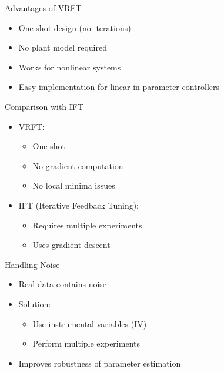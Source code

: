 \documentclass[hyperref={pdfpagemode=FullScreen},aspectratio=169]{beamer}
\begin{document}

\begin{frame}{Advantages of VRFT}
\begin{itemize}
\item One-shot design (no iterations)
\item No plant model required
\item Works for nonlinear systems
\item Easy implementation for linear-in-parameter controllers
\end{itemize}
\end{frame}


\begin{frame}{Comparison with IFT}
\begin{itemize}
\item VRFT:
\begin{itemize}
\item One-shot
\item No gradient computation
\item No local minima issues
\end{itemize}
\item IFT (Iterative Feedback Tuning):
\begin{itemize}
\item Requires multiple experiments
\item Uses gradient descent
\end{itemize}
\end{itemize}
\end{frame}


\begin{frame}{Handling Noise}
\begin{itemize}
\item Real data contains noise
\item Solution:
\begin{itemize}
\item Use instrumental variables (IV)
\item Perform multiple experiments
\end{itemize}
\item Improves robustness of parameter estimation
\end{itemize}
\end{frame}

\end{document}
